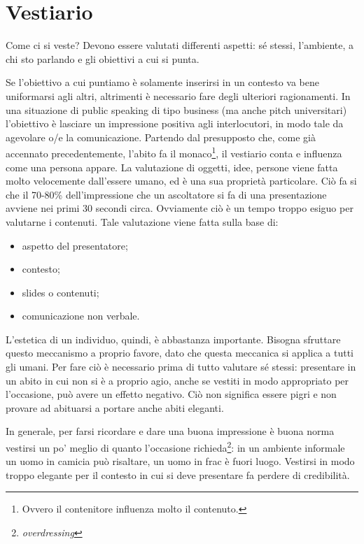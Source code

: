 \section{Vestiario}

Come ci si veste? Devono essere valutati differenti aspetti: sé stessi,
l'ambiente, a chi sto parlando e gli obiettivi a cui si punta.

Se l'obiettivo a cui puntiamo è solamente inserirsi in un contesto va bene
uniformarsi agli altri, altrimenti è necessario fare degli ulteriori
ragionamenti. In una situazione di public speaking di tipo business (ma anche
pitch universitari) l'obiettivo è lasciare un impressione positiva agli
interlocutori, in modo tale da agevolare o/e la comunicazione. Partendo
dal presupposto che, come già accennato precedentemente, l'abito fa il
monaco\footnote{Ovvero il contenitore influenza molto il contenuto.}, il
vestiario conta e influenza come una persona appare. La valutazione di oggetti,
idee, persone viene fatta molto velocemente dall'essere umano, ed è una sua
proprietà particolare. Ciò fa si che il 70-80\% dell'impressione che
un ascoltatore si fa di una presentazione avviene nei primi 30 secondi circa.
Ovviamente ciò è un tempo troppo esiguo per valutarne i contenuti. Tale
valutazione viene fatta sulla base di:
\begin{itemize}
\item aspetto del presentatore;
\item contesto;
\item slides o contenuti;
\item comunicazione non verbale.
\end{itemize}

L'estetica di un individuo, quindi, è abbastanza importante. Bisogna sfruttare
questo meccanismo a proprio favore, dato che questa meccanica si applica a tutti
gli umani. Per fare ciò è necessario prima di tutto valutare sé stessi:
presentare in un abito in cui non si è a proprio agio, anche se vestiti in modo
appropriato per l'occasione, può avere un effetto negativo. Ciò non significa
essere pigri e non provare ad abituarsi a portare anche abiti eleganti.

In generale, per farsi ricordare e dare una buona impressione è buona norma
vestirsi un po' meglio di quanto l'occasione
richieda\footnote{\textit{overdressing}}: in un ambiente informale un uomo in
camicia può risaltare, un uomo in frac è fuori luogo. Vestirsi in modo troppo
elegante per il contesto in cui si deve presentare fa perdere di credibilità.

